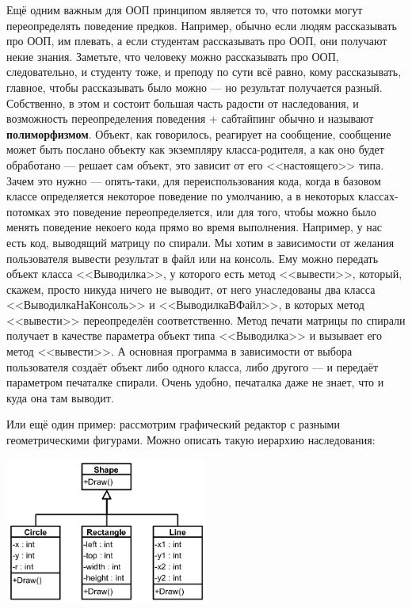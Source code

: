 \documentclass[a5paper]{article}
\begin{document}
Ещё одним важным для ООП принципом является то, что потомки могут переопределять поведение предков. Например, обычно если людям рассказывать про ООП, им плевать, а если студентам рассказывать про ООП, они получают некие знания. Заметьте, что человеку можно рассказывать про ООП, следовательно, и студенту тоже, и преподу по сути всё равно, кому рассказывать, главное, чтобы рассказывать было можно --- но результат получается разный. Собственно, в этом и состоит большая часть радости от наследования, и возможность переопределения поведения + сабтайпинг обычно и называют \textbf{полиморфизмом}. Объект, как говорилось, реагирует на сообщение, сообщение может быть послано объекту как экземпляру класса-родителя, а как оно будет обработано --- решает сам объект, это зависит от его <<настоящего>> типа. Зачем это нужно --- опять-таки, для переиспользования кода, когда в базовом классе определяется некоторое поведение по умолчанию, а в некоторых классах-потомках это поведение переопределяется, или для того, чтобы можно было менять поведение некоего кода прямо во время выполнения. Например, у нас есть код, выводящий матрицу по спирали. Мы хотим в зависимости от желания пользователя вывести результат в файл или на консоль. Ему можно передать объект класса <<Выводилка>>, у которого есть метод <<вывести>>, который, скажем, просто никуда ничего не выводит, от него унаследованы два класса <<ВыводилкаНаКонсоль>> и <<ВыводилкаВФайл>>, в которых метод <<вывести>> переопределён соответственно. Метод печати матрицы по спирали получает в качестве параметра объект типа <<Выводилка>> и вызывает его метод <<вывести>>. А основная программа в зависимости от выбора пользователя создаёт объект либо одного класса, либо другого --- и передаёт параметром печаталке спирали. Очень удобно, печаталка даже не знает, что и куда она там выводит.

Или ещё один пример: рассмотрим графический редактор с разными геометрическими фигурами. Можно описать такую иерархию наследования:

\begin{center}
    \includegraphics[width=0.5\textwidth]{polymorphism.png}
\end{center}
\end{document}
